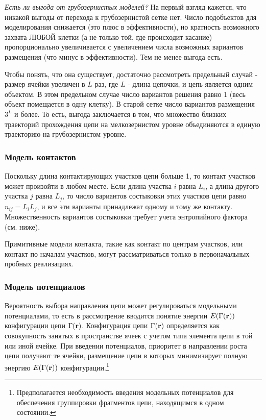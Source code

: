 \documentclass[tikz,a4paper]{scrartcl} %
\begin{document}
\textit{Есть ли выгода от грубозернистых моделей?} На первый взгляд кажется, что никакой выгоды от перехода к грубозернистой сетке нет. Число подобъектов для моделирования снижается (это плюс в эффективности), но кратность возможного захвата ЛЮБОЙ клетки (а не только той, где происходит касание) пропорционально увеличивается с увеличением числа возможных вариантов размещения (что минус в эффективности). Тем не менее выгода есть. 

Чтобы понять, что она существует, достаточно рассмотреть предельный случай - размер ячейки увеличен в $L$ раз, где $L$ - длина цепочки, и цепь является одним объектом. В этом предельном случае число вариантов решения равно 1 (весь объект помещается в одну клетку). В старой сетке число вариантов размещения $3^L$ и более. То есть, выгода заключается в том, что множество близких траекторий прохождения цепи на мелкозернистом уровне объединяются в единую траекторию на грубозернистом уровне.

\subsubsection*{Модель контактов}
Поскольку длина контактирующих участков цепи больше 1, то контакт участков может произойти в любом месте. Если длина участка $i$ равна $L_i$, а длина другого участка $j$ равна $L_j$, то число вариантов состыковки этих участков цепи равно $n_{ij} = L_i L_j$, и все эти варианты принадлежат одному и тому же контакту. Множественность вариантов состыковки требует учета энтропийного фактора (см. ниже).

Примитивные модели контакта, такие как контакт по центрам участков, или контакт по началам участков, могут рассматриваться только в первоначальных пробных реализациях. 

\subsubsection*{Модель потенциалов}
Вероятность выбора направления цепи может регулироваться модельными потенциалами, то есть в рассмотрение вводится понятие энергии $E(\Gamma(\bold r))$ конфигурации цепи $\Gamma(\bold r)$. Конфигурация цепи $\Gamma(\bold r)$ определяется как совокупность занятых в пространстве ячеек с учетом типа элемента цепи в той или иной ячейке. При введении потенциалов, приоритет в направлении роста цепи получают те ячейки, размещение цепи в которых минимизирует полную энергию $E(\Gamma(\bold r))$ конфигурации.\footnote{Предполагается необходимость введения модельных потенциалов для обеспечения группировки фрагментов цепи, находящимся в одном состоянии.} 
\end{document}
